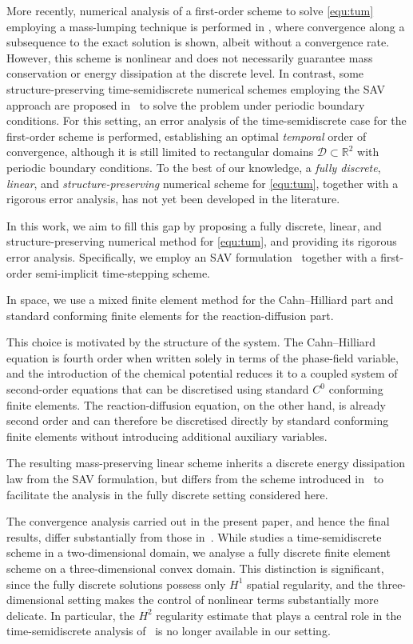 \documentclass[11pt, reqno]{amsart}
\theoremstyle{definition}
\numberwithin{equation}{section}
\newcommand{\bb}{\mathbb}
\begin{document}
More recently, numerical analysis of a first-order scheme to solve \eqref{equ:tum} employing a mass-lumping technique is performed in \cite{GarTra22}, where convergence along a subsequence to the exact solution is shown, albeit without a convergence rate. However, this scheme is nonlinear and does not necessarily guarantee mass conservation or energy dissipation at the discrete level. In contrast, some structure-preserving time-semidiscrete numerical schemes employing the SAV approach are proposed in~\cite{WanLinYan25} to solve the problem under periodic boundary conditions. For this setting, an error analysis of the time-semidiscrete case for the first-order scheme is performed, establishing an optimal \emph{temporal} order of convergence, although it is still limited to rectangular domains $\mathscr{D}\subset \bb{R}^2$ with periodic boundary conditions. To the best of our knowledge, a \emph{fully discrete}, \emph{linear}, and \emph{structure-preserving} numerical scheme for \eqref{equ:tum}, together with a rigorous error analysis, has not yet been developed in the literature.

In this work, we aim to fill this gap by proposing a fully discrete, linear, and structure-preserving numerical method for \eqref{equ:tum}, and providing its rigorous error analysis. Specifically, we employ an SAV formulation~\cite{SheXuYan19} together with a first-order semi-implicit time-stepping scheme. {In space, we use a mixed finite element method for the Cahn--Hilliard part and standard conforming finite elements for the reaction-diffusion part. 

This choice is motivated by the structure of the system. The Cahn--Hilliard equation is fourth order when written solely in terms of the phase-field variable, and the introduction of the chemical potential reduces it to a coupled system of second-order equations that can be discretised using standard $C^0$ conforming finite elements. The reaction-diffusion equation, on the other hand, is already second order and can therefore be discretised directly by standard conforming finite elements without introducing additional auxiliary variables.} The resulting mass-preserving linear scheme inherits a discrete energy dissipation law from the SAV formulation, but differs from the scheme introduced in~\cite{WanLinYan25} to facilitate the analysis in the fully discrete setting considered here. 

The convergence analysis carried out in the present paper, and hence the final results, differ substantially from those in~\cite{WanLinYan25}. While \cite{WanLinYan25} studies a time-semidiscrete scheme in a two-dimensional domain, we analyse a fully discrete finite element scheme on a three-dimensional convex domain. This distinction is significant, since the fully discrete solutions possess only $H^1$ spatial regularity, and the three-dimensional setting makes the control of nonlinear terms substantially more delicate. In particular, the $H^2$ regularity estimate that plays a central role in the time-semidiscrete analysis of~\cite{WanLinYan25} is no longer available in our setting.
\end{document}
